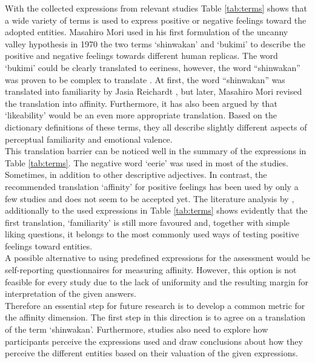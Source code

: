 With the collected expressions from relevant studies Table \ref{tab:terms} shows that a wide variety of terms is used to express positive or negative feelings toward the adopted entities. Masahiro Mori used in his first formulation of the uncanny valley hypothesis in 1970  \cite{original_masahiro_not_translated} the two terms `shinwakan' and `bukimi' to describe the positive and negative feelings towards different human replicas. The word `bukimi' could be clearly translated to eeriness, however, the word “shinwakan” was proven to be complex to translate \cite{quant_review}. At first, the word “shinwakan” was translated into familiarity by Jasia Reichardt \cite{first_translation}, but later, Masahiro Mori revised the translation into affinity. Furthermore, it has also been argued by \cite{uncanny_cliff} that `likeability' would be an even more appropriate translation. Based on the dictionary definitions of these terms, they all describe slightly different aspects of perceptual familiarity and emotional valence.\\
This translation barrier can be noticed well in the summary of the expressions in Table \ref{tab:terms}. The negative word `eerie' was used in most of the studies. Sometimes, in addition to other descriptive adjectives. In contrast, the recommended translation `affinity' for positive feelings has been used by only a few studies and does not seem to be accepted yet. The literature analysis by \cite{quant_review}, additionally to the used expressions in Table \ref{tab:terms} shows evidently that the first translation, `familiarity' is still more favoured and, together with simple liking questions, it belongs to the most commonly used ways of testing positive feelings toward entities.\\
A possible alternative to using predefined expressions for the assessment would be self-reporting questionnaires for measuring affinity. However, this option is not feasible for every study due to the lack of uniformity and the resulting margin for interpretation of the given answers.\\
Therefore an essential step for future research is to develop a common metric for the affinity dimension. The first step in this direction is to agree on a translation of the term `shinwakan'. Furthermore, studies also need to explore how participants perceive the expressions used and draw conclusions about how they perceive the different entities based on their valuation of the given expressions. 
\newpage

